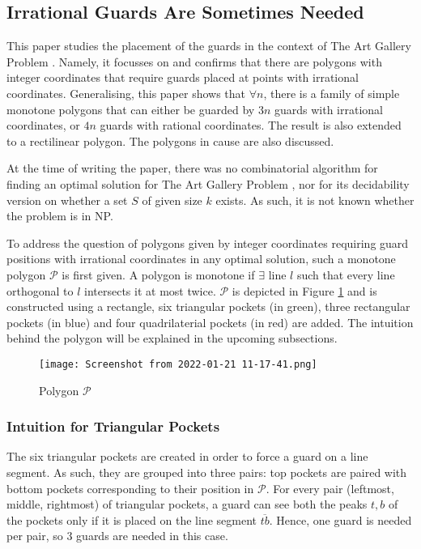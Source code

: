 \subsection{Irrational Guards Are Sometimes Needed \cite{abrahamsen2021art}}
This paper \cite{abrahamsen2021art} studies the placement of the guards in the context of The Art Gallery Problem \cite{o1987art}. Namely, it focusses on and confirms that there are polygons with integer coordinates that require guards placed at points with irrational coordinates. Generalising, this paper shows that $\forall n$, there is a family of simple monotone polygons that can either be guarded by $3n$ guards with irrational coordinates, or $4n$ guards with rational coordinates. The result is also extended to a rectilinear polygon. The polygons in cause are also discussed.


At the time of writing the paper, there was no combinatorial algorithm for finding an optimal solution for The Art Gallery Problem \cite{o1987art}, nor for its decidability version on whether a set $S$ of given size $k$ exists. As such, it is not known whether the problem is in NP.

To address the question of polygons given by integer coordinates requiring guard positions with irrational coordinates in any optimal solution, such a monotone polygon $\mathcal P$ is first given. A polygon is monotone if $\exists$ line $l$ such that every line orthogonal to $l$ intersects it at most twice. $\mathcal P$ is depicted in Figure \ref{fig:p} and is constructed using a rectangle, six triangular pockets (in green), three rectangular pockets (in blue) and four quadrilaterial pockets (in red) are added. The intuition behind the polygon will be explained in the upcoming subsections.

\begin{figure}[h!]
    \centering
    \texttt{[image: Screenshot from 2022-01-21 11-17-41.png]}
    \caption{Polygon $\mathcal P$}
    \label{fig:p}
\end{figure}

\subsubsection{Intuition for Triangular Pockets}
The six triangular pockets are created in order to force a guard on a line segment. As such, they are grouped into three pairs: top pockets are paired with bottom pockets corresponding to their position in $\mathcal P$. For every pair (leftmost, middle, rightmost) of triangular pockets, a guard can see both the peaks $t, b$ of the pockets only if it is placed on the line segment $\overline{tb}$. Hence, one guard is needed per pair, so 3 guards are needed in this case.

